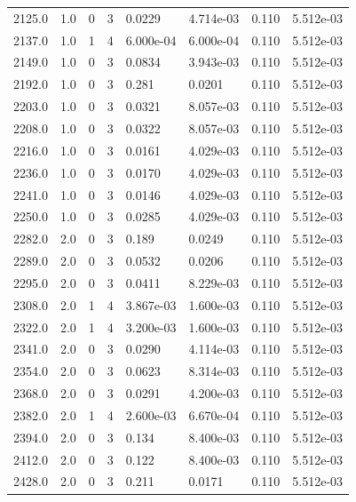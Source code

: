 \documentclass[preview]{standalone}
\begin{document}
{{{{{{{\begin{tabular}{L{1.2cm}C{1.2cm} C{0.3cm}C{0.5cm} C{1.4cm}C{1.4cm} C{1.4cm}C{1.4cm}}
  2125.0  &   1.0  & 0     &  3 &  0.0229  & 4.714e-03  & 0.110 &  5.512e-03   \\ 
  2137.0  &   1.0  & 1     &  4 &  6.000e-04  & 6.000e-04  & 0.110 &  5.512e-03   \\ 
  2149.0  &   1.0  & 0     &  3 &  0.0834  & 3.943e-03  & 0.110 &  5.512e-03   \\ 
  2192.0  &   1.0  & 0     &  3 &  0.281  & 0.0201  & 0.110 &  5.512e-03   \\ 
  2203.0  &   1.0  & 0     &  3 &  0.0321  & 8.057e-03  & 0.110 &  5.512e-03   \\ 
  2208.0  &   1.0  & 0     &  3 &  0.0322  & 8.057e-03  & 0.110 &  5.512e-03   \\ 
  2216.0  &   1.0  & 0     &  3 &  0.0161  & 4.029e-03  & 0.110 &  5.512e-03   \\ 
  2236.0  &   1.0  & 0     &  3 &  0.0170  & 4.029e-03  & 0.110 &  5.512e-03   \\ 
  2241.0  &   1.0  & 0     &  3 &  0.0146  & 4.029e-03  & 0.110 &  5.512e-03   \\ 
  2250.0  &   1.0  & 0     &  3 &  0.0285  & 4.029e-03  & 0.110 &  5.512e-03   \\ 
  2282.0  &   2.0  & 0     &  3 &  0.189  & 0.0249  & 0.110 &  5.512e-03   \\ 
  2289.0  &   2.0  & 0     &  3 &  0.0532  & 0.0206  & 0.110 &  5.512e-03   \\ 
  2295.0  &   2.0  & 0     &  3 &  0.0411  & 8.229e-03  & 0.110 &  5.512e-03   \\ 
  2308.0  &   2.0  & 1     &  4 &  3.867e-03  & 1.600e-03  & 0.110 &  5.512e-03   \\ 
  2322.0  &   2.0  & 1     &  4 &  3.200e-03  & 1.600e-03  & 0.110 &  5.512e-03   \\ 
  2341.0  &   2.0  & 0     &  3 &  0.0290  & 4.114e-03  & 0.110 &  5.512e-03   \\ 
  2354.0  &   2.0  & 0     &  3 &  0.0623  & 8.314e-03  & 0.110 &  5.512e-03   \\ 
  2368.0  &   2.0  & 0     &  3 &  0.0291  & 4.200e-03  & 0.110 &  5.512e-03   \\ 
  2382.0  &   2.0  & 1     &  4 &  2.600e-03  & 6.670e-04  & 0.110 &  5.512e-03   \\ 
  2394.0  &   2.0  & 0     &  3 &  0.134  & 8.400e-03  & 0.110 &  5.512e-03   \\ 
  2412.0  &   2.0  & 0     &  3 &  0.122  & 8.400e-03  & 0.110 &  5.512e-03   \\ 
  2428.0  &   2.0  & 0     &  3 &  0.211  & 0.0171  & 0.110 &  5.512e-03   \\ 

\end{tabular}}}}}}}}
\end{document}
